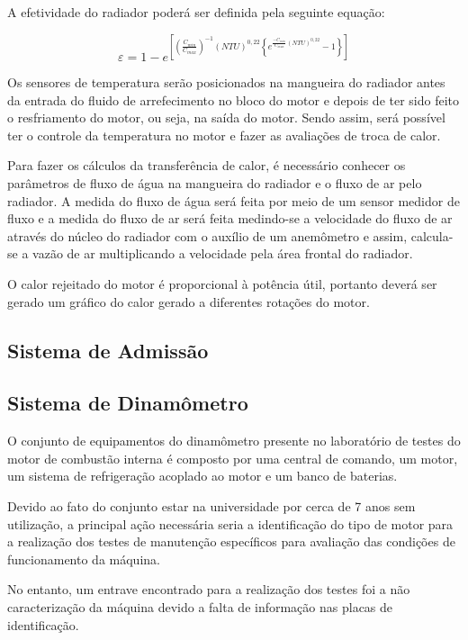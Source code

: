 A efetividade do radiador poderá ser definida pela seguinte equação:

\begin{equation}
	\varepsilon = 1 - e^{\left [ \left ( \frac{C_{min}}{C_{max}} \right ) ^{-1} \left ( NTU \right ) ^{0,22} \left \{ e^{\frac{-C_{min}}{C_{max}} \left ( NTU \right ) ^{0,22}} -1 \right \} \right ]}
\end{equation}

Os sensores de temperatura serão posicionados na mangueira do radiador antes da entrada do fluido de arrefecimento no bloco do motor e depois de ter sido feito o resfriamento do motor, ou seja, na saída do motor. Sendo assim, será possível ter o controle da temperatura no motor e fazer as avaliações de troca de calor.

Para fazer os cálculos da transferência de calor, é necessário conhecer os parâmetros de fluxo de água na mangueira do radiador e o fluxo de ar pelo radiador. A medida do fluxo de água será feita por meio de um sensor medidor de fluxo e a medida do fluxo de ar será feita medindo-se a velocidade do fluxo de ar através do núcleo do radiador com o auxílio de um anemômetro e assim, calcula-se a vazão de ar multiplicando a velocidade pela área frontal do radiador.

O calor rejeitado do motor é proporcional à potência útil, portanto deverá ser gerado um gráfico do calor gerado a diferentes rotações do motor.

\subsection{Sistema de Admissão}

\subsection{Sistema de Dinamômetro}

O conjunto de equipamentos do dinamômetro presente no laboratório de testes do motor de combustão interna é composto por uma central de comando, um motor, um sistema de refrigeração acoplado ao motor e um banco de baterias.

Devido ao fato do conjunto estar na universidade por cerca de 7 anos sem utilização, a principal ação necessária seria a identificação do tipo de motor para a realização dos testes de manutenção específicos para avaliação das condições de funcionamento da máquina.

No entanto, um entrave encontrado para a realização dos testes foi a não caracterização da máquina devido a falta de informação nas placas de identificação.

